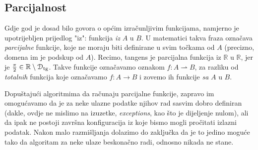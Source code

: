 \subsection{Parcijalnost}

Gdje god je dosad bilo govora o općim izračunljivim funkcijama, namjerno je upotrijebljen prijedlog "iz": funkcija \emph{iz} $A$ u $B$. U matematici takva fraza označava \emph{parcijalne} funkcije, koje ne moraju biti definirane u svim točkama od $A$ (precizno, domena im je podskup od $A$). Recimo, tangens je parcijalna funkcija iz $\mathbb R$ u $\mathbb R$, jer je $\frac{\pi}{2}\in\mathbb R\setminus \mathcal D_{\text{tg}}$. Takve funkcije označavamo oznakom $f:A\rightharpoonup B$, za razliku od \emph{totalnih} funkcija koje označavamo $f:A\to B$ i zovemo ih funkcije \emph{sa} $A$ u $B$. 

Dopuštajući algoritmima da računaju parcijalne funkcije, zapravo im omogućavamo da je za neke ulazne podatke njihov rad sasvim dobro definiran (dakle, ovdje ne mislimo na izuzetke, \emph{exceptions}, kao što je dijeljenje nulom), ali da ipak ne postoji završna konfiguracija iz koje bismo mogli pročitati izlazni podatak. Nakon malo razmišljanja dolazimo do zaključka da je to jedino moguće tako da algoritam za neke ulaze beskonačno radi, odnosno nikada ne stane.

